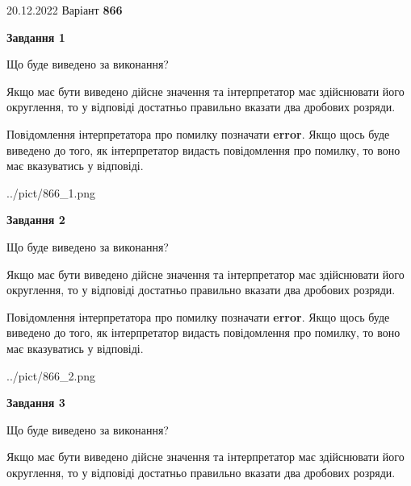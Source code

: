 \documentclass[12pt, ukrainian]{article}
\begin{document}
{20.12.2022 Варіант \No \textbf { 866 }\par}
{
\begin {Large}

{\begin {center}\textbf{Завдання 1}\end {center}}\par
Що буде виведено за виконання? \par

Якщо має бути виведено дійсне значення та інтерпретатор має здійснювати його округлення, 
то у відповіді достатньо правильно вказати два дробових розряди.

Повідомлення інтерпретатора про помилку позначати \textbf{error}.
Якщо щось буде виведено до того, як інтерпретатор видасть повідомлення про помилку, 
то воно має вказуватись у відповіді. \par

\begin{center}
	{../pict/866_1.png}
\end{center}
\newpage

{\begin {center}\textbf{Завдання 2}\end {center}}\par
Що буде виведено за виконання? \par

Якщо має бути виведено дійсне значення та інтерпретатор має здійснювати його округлення, 
то у відповіді достатньо правильно вказати два дробових розряди.

Повідомлення інтерпретатора про помилку позначати \textbf{error}.
Якщо щось буде виведено до того, як інтерпретатор видасть повідомлення про помилку, 
то воно має вказуватись у відповіді. \par

\begin{center}
	{../pict/866_2.png}
\end{center}
\newpage

{\begin {center}\textbf{Завдання 3}\end {center}}\par
Що буде виведено за виконання? \par

Якщо має бути виведено дійсне значення та інтерпретатор має здійснювати його округлення, 
то у відповіді достатньо правильно вказати два дробових розряди.


\end{Large}}
\end{document}
